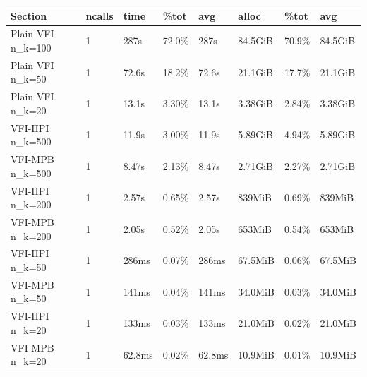 \documentclass[]{article}
\begin{document}
\begin{longtable}[]{@{}llllllll@{}}
\toprule
Section & ncalls & time & \%tot & avg & alloc & \%tot &
avg\tabularnewline
\midrule
\endhead
Plain VFI n\_k=100 & 1 & 287s & 72.0\% & 287s & 84.5GiB & 70.9\% &
84.5GiB\tabularnewline
Plain VFI n\_k=50 & 1 & 72.6s & 18.2\% & 72.6s & 21.1GiB & 17.7\% &
21.1GiB\tabularnewline
Plain VFI n\_k=20 & 1 & 13.1s & 3.30\% & 13.1s & 3.38GiB & 2.84\% &
3.38GiB\tabularnewline
VFI-HPI n\_k=500 & 1 & 11.9s & 3.00\% & 11.9s & 5.89GiB & 4.94\% &
5.89GiB\tabularnewline
VFI-MPB n\_k=500 & 1 & 8.47s & 2.13\% & 8.47s & 2.71GiB & 2.27\% &
2.71GiB\tabularnewline
VFI-HPI n\_k=200 & 1 & 2.57s & 0.65\% & 2.57s & 839MiB & 0.69\% &
839MiB\tabularnewline
VFI-MPB n\_k=200 & 1 & 2.05s & 0.52\% & 2.05s & 653MiB & 0.54\% &
653MiB\tabularnewline
VFI-HPI n\_k=50 & 1 & 286ms & 0.07\% & 286ms & 67.5MiB & 0.06\% &
67.5MiB\tabularnewline
VFI-MPB n\_k=50 & 1 & 141ms & 0.04\% & 141ms & 34.0MiB & 0.03\% &
34.0MiB\tabularnewline
VFI-HPI n\_k=20 & 1 & 133ms & 0.03\% & 133ms & 21.0MiB & 0.02\% &
21.0MiB\tabularnewline
VFI-MPB n\_k=20 & 1 & 62.8ms & 0.02\% & 62.8ms & 10.9MiB & 0.01\% &
10.9MiB\tabularnewline
\bottomrule
\end{longtable}
\end{document}
